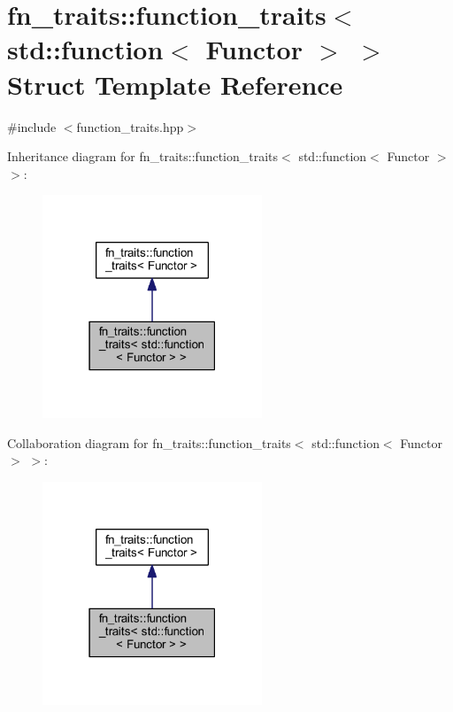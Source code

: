 \hypertarget{structfn__traits_1_1function__traits_3_01std_1_1function_3_01_functor_01_4_01_4}{}\section{fn\+\_\+traits\+:\+:function\+\_\+traits$<$ std\+:\+:function$<$ Functor $>$ $>$ Struct Template Reference}
\label{structfn__traits_1_1function__traits_3_01std_1_1function_3_01_functor_01_4_01_4}


{\ttfamily \#include $<$function\+\_\+traits.\+hpp$>$}



Inheritance diagram for fn\+\_\+traits\+:\+:function\+\_\+traits$<$ std\+:\+:function$<$ Functor $>$ $>$\+:\nopagebreak
\begin{figure}[H]
\begin{center}
\leavevmode
\includegraphics[width=186pt]{dc/df7/structfn__traits_1_1function__traits_3_01std_1_1function_3_01_functor_01_4_01_4__inherit__graph}
\end{center}
\end{figure}


Collaboration diagram for fn\+\_\+traits\+:\+:function\+\_\+traits$<$ std\+:\+:function$<$ Functor $>$ $>$\+:\nopagebreak
\begin{figure}[H]
\begin{center}
\leavevmode
\includegraphics[width=186pt]{d4/d3f/structfn__traits_1_1function__traits_3_01std_1_1function_3_01_functor_01_4_01_4__coll__graph}
\end{center}
\end{figure}


